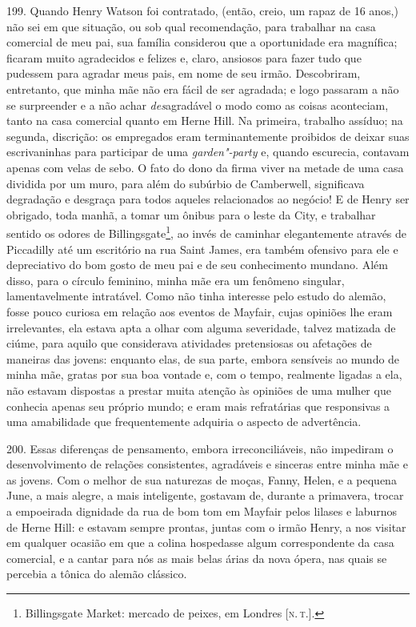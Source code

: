 199. Quando Henry Watson foi contratado, (então, creio, um rapaz de 16
anos,) não sei em que situação, ou sob qual recomendação, para trabalhar
na casa comercial de meu pai, sua família considerou que a oportunidade
era magnífica; ficaram muito agradecidos e felizes e, claro, ansiosos
para fazer tudo que pudessem para agradar meus pais, em nome de seu
irmão. Descobriram, entretanto, que minha mãe não era fácil de ser
agradada; e logo passaram a não se surpreender e a não achar
\emph{des}agradável o modo como as coisas aconteciam, tanto na casa
comercial quanto em Herne Hill. Na primeira, trabalho assíduo; na
segunda, discrição: os empregados eram terminantemente proibidos de
deixar suas escrivaninhas para participar de uma \emph{garden"-party} e,
quando escurecia, contavam apenas com velas de sebo. O fato do dono da
firma viver na metade de uma casa dividida por um muro, para além do
subúrbio de Camberwell, significava degradação e desgraça para todos
aqueles relacionados ao negócio! E de Henry ser obrigado, toda manhã, a
tomar um ônibus para o leste da City, e trabalhar sentido os odores de
Billingsgate\footnote{Billingsgate Market: mercado de peixes, em Londres
  {[}\textsc{n.\,t.}{]}.}, ao invés de caminhar elegantemente através de
Piccadilly até um escritório na rua Saint James, era também ofensivo
para ele e depreciativo do bom gosto de meu pai e de seu conhecimento
mundano. Além disso, para o círculo feminino, minha mãe era um fenômeno
singular, lamentavelmente intratável. Como não tinha interesse pelo
estudo do alemão, fosse pouco curiosa em relação aos eventos de Mayfair,
cujas opiniões lhe eram irrelevantes, ela estava apta a olhar com alguma
severidade, talvez matizada de ciúme, para aquilo que considerava
atividades pretensiosas ou afetações de maneiras das jovens: enquanto
elas, de sua parte, embora sensíveis ao mundo de minha mãe, gratas por
sua boa vontade e, com o tempo, realmente ligadas a ela, não estavam
dispostas a prestar muita atenção às opiniões de uma mulher que conhecia
apenas seu próprio mundo; e eram mais refratárias que responsivas a uma
amabilidade que frequentemente adquiria o aspecto de advertência.

200. Essas diferenças de pensamento, embora irreconciliáveis, não
impediram o desenvolvimento de relações consistentes, agradáveis e
sinceras entre minha mãe e as jovens. Com o melhor de sua naturezas de
moças, Fanny, Helen, e a pequena June, a mais alegre, a mais
inteligente, gostavam de, durante a primavera, trocar a empoeirada
dignidade da rua de bom tom em Mayfair pelos lilases e laburnos de Herne
Hill: e estavam sempre prontas, juntas com o irmão Henry, a nos visitar
em qualquer ocasião em que a colina hospedasse algum correspondente da
casa comercial, e a cantar para nós as mais belas árias da nova ópera,
nas quais se percebia a tônica do alemão clássico.

